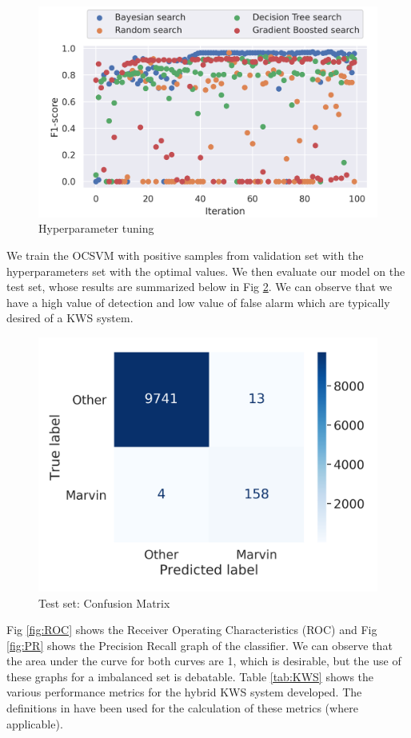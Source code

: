 \documentclass[a4paper]{article}
\begin{document}
\begin{figure}[htb]
	\centering
	\includegraphics[width=1\linewidth]{../results/marvin_tuning.png}
	\caption{Hyperparameter tuning}
	\label{fig:hyper_tune}
\end{figure}

We train the OCSVM with positive samples from validation set with the hyperparameters set with the optimal values. We then evaluate our model on the test set, whose results are summarized below in Fig \ref{fig:results}. We can observe that we have a high value of detection and low value of false alarm which are typically desired of a KWS system.

\begin{figure}[htb]
	\centering
	\includegraphics[width=0.8\linewidth]{../results/marvin_cm_without_noise.png}
	\caption{Test set: Confusion Matrix}
	\label{fig:results}
\end{figure}

Fig \ref{fig:ROC} shows the Receiver Operating Characteristics (ROC) and Fig \ref{fig:PR} shows the Precision Recall graph of the classifier. We can observe that the area under the curve for both curves are 1, which is desirable, but the use of these graphs for a imbalanced set is debatable. Table \ref{tab:KWS} shows the various performance metrics for the hybrid KWS system developed. The definitions in \cite{Tabibian, Section 2.2} have been used for the calculation of these metrics (where applicable).
\end{document}
